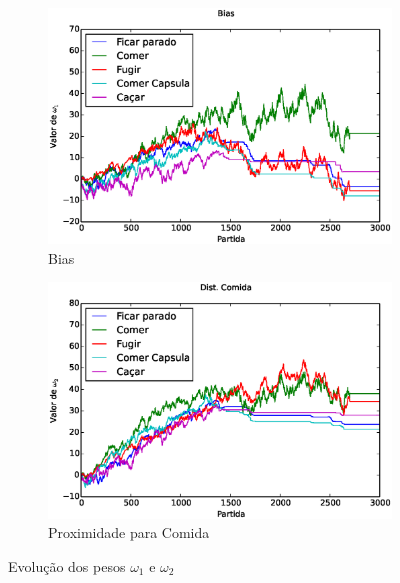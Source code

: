 \begin{figure}[H]
	\centering
	\begin{subfigure}[t]{.5\textwidth}
		\centering
		\includegraphics[width=\linewidth]{images/5_behaviors_small_map/weights____pol__Bias}
		\caption{Bias}
		\label{img:5ComportamentosMapaPequeno:PesoBias}
	\end{subfigure}%
	\begin{subfigure}[t]{.5\textwidth}
		\centering
		\includegraphics[width=\linewidth]{images/5_behaviors_small_map/weights____pol__DistComida}
		\caption{Proximidade para Comida}
		\label{img:5ComportamentosMapaPequeno:PesoDistComida}
	\end{subfigure}
	\caption{Evolução dos pesos $ \omega_1 $ e $ \omega_2 $}
	\label{img:5ComportamentosMapaPequeno:PesoBiasAndDistComida}
\end{figure}

